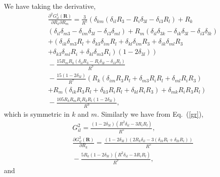 We have taking the derivative,
\begin{eqnarray}&&\!\!\!\!\!\!\!\!\!\!
\frac{\partial^2 G^1_{il}(\bm R)}{\partial R_k \partial R_m}=\frac{3}{R^5}\left(
\delta_{km}\left(\delta_{il}R_3-R_i\delta_{3l}\!-\!\delta_{i3}R_l\right)+\!R_k\right.\nonumber\\&&\!\!\!\!\!\!\!\!\!\!\left.
\left(\delta_{il}\delta_{m3}\!-\!\delta_{im}\delta_{3l}\!-\!\delta_{i3}\delta_{ml}\right)\!+\!R_m\left(\delta_{il}\delta_{3k}\!-\!\delta_{ik}\delta_{3l}\!-\!\delta_{i3}\delta_{lk}\right)
\right.\nonumber\\&&\!\!\!\!\!\!\!\!\!\!\left.
+\left(\delta_{ik}\delta_{m3}R_l+\delta_{k3}\delta_{im}R_l+\delta_{kl}\delta_{im}R_3+\delta_{ik}\delta_{ml}R_3\right.\right.\nonumber\\&&\!\!\!\!\!\!\!\!\!\!\left.\left.
+\delta_{k3}\delta_{ml}R_i+\delta_{kl}\delta_{m3}R_i\right)\left(1-2\delta_{3l}\right)\right)
\nonumber\\&&\!\!\!\!\!\!\!\!\!\!
-\frac{15 R_mR_k\left(\delta_{il}R_3-R_i\delta_{3l}\!-\!\delta_{i3}R_l\right)}{R^7}
\nonumber\\&&\!\!\!\!\!\!\!\!\!\!
-\frac{15\left(1-2\delta_{3l}\right)}{R^7} \left(R_k\left(\delta_{im}R_3R_l+\delta_{m3}R_iR_l+\delta_{ml}R_iR_3\right)\right.
\nonumber\\&&\!\!\!\!\!\!\!\!\!\!\left.
+R_m\left(\delta_{ik}R_3R_l+\delta_{k3}R_iR_l+\delta_{kl}R_iR_3\right)+\delta_{mk}R_iR_3R_l\right)\nonumber\\&&\!\!\!\!\!\!\!\!\!\!
-\frac{105R_kR_mR_iR_3R_l\left(1-2\delta_{3l}\right)}{R^9}, \label{derivative}
\end{eqnarray}
which is symmetric in $k$ and $m$. Similarly we have from Eq.~(\ref{gr}),
\begin{eqnarray}&&\!\!\!\!\!\!\!\!\!\!\!\!\!\!\!\!
G^2_{il}\!=\!\frac{\left(1\!-\!2\delta_{3l}\right)\left(R^2\delta_{il}\!-\!3R_iR_l\right)}{R^5},\nonumber\\&&\!\!\!\!\!\!\!\!\!\!\!\!\!\!\!\!
\frac{\partial G^2_{il}(\bm R)}{\partial R_k}=\frac{\left(1\!-\!2\delta_{3l}\right)\left(2R_k\delta_{il}\!-\!3\left(\delta_{ik}R_l+\delta_{lk}R_i\right)\right)}{R^5}
\nonumber\\&&\!\!\!\!\!\!\!\!\!\!\!\!\!\!\!\!
-\frac{5R_k\left(1\!-\!2\delta_{3l}\right)\left(R^2\delta_{il}\!-\!3R_iR_l\right)}{R^7},
\end{eqnarray}
and
